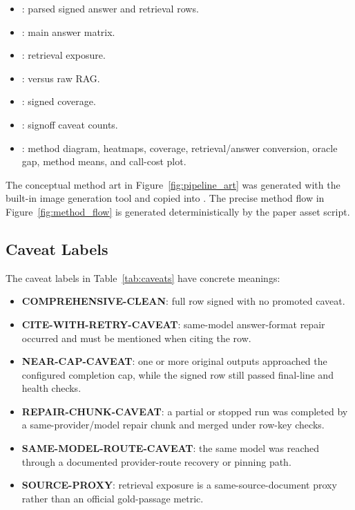 \begin{itemize}[leftmargin=*]
\item {}: parsed signed answer and
retrieval rows.
\item {}: main answer matrix.
\item {}: retrieval exposure.
\item {}: \hyre{} versus raw RAG.
\item {}: signed coverage.
\item {}: signoff caveat counts.
\item {}: method diagram, heatmaps, coverage,
retrieval/answer conversion, oracle gap, method means, and call-cost plot.
\end{itemize}

The conceptual method art in Figure~\ref{fig:pipeline_art} was generated with
the built-in image generation tool and copied into
. The precise method flow
in Figure~\ref{fig:method_flow} is generated deterministically by the paper
asset script.

\subsection{Caveat Labels}

The caveat labels in Table~\ref{tab:caveats} have concrete meanings:

\begin{itemize}[leftmargin=*]
\item \textbf{COMPREHENSIVE-CLEAN}: full row signed with no promoted caveat.
\item \textbf{CITE-WITH-RETRY-CAVEAT}: same-model answer-format repair occurred
and must be mentioned when citing the row.
\item \textbf{NEAR-CAP-CAVEAT}: one or more original outputs approached the
configured completion cap, while the signed row still passed final-line and
health checks.
\item \textbf{REPAIR-CHUNK-CAVEAT}: a partial or stopped run was completed by a
same-provider/model repair chunk and merged under row-key checks.
\item \textbf{SAME-MODEL-ROUTE-CAVEAT}: the same model was reached through a
documented provider-route recovery or pinning path.
\item \textbf{SOURCE-PROXY}: retrieval exposure is a same-source-document proxy
rather than an official gold-passage metric.
\end{itemize}

